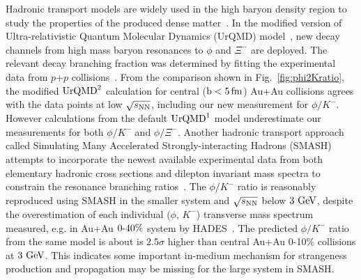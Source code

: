 \documentclass[%
 reprint,	
showpacs,
 amsmath,amssymb,
 aps,
 superscriptaddress,
]{revtex4-1}
\begin{document}
Hadronic transport models are widely used in the high baryon density region to study the properties of the produced dense matter~\cite{urQMD,UrQMD_2,Steinheimer_2015_UrQMD,Elfner_SMASH,Hartnack:2011cn,Song:2020clw}. In the modified version of Ultra-relativistic Quantum Molecular Dynamics (UrQMD) model~\cite{Steinheimer_2015_UrQMD}, new decay channels from high mass baryon resonances to $\phi$ and $\Xi^-$ are deployed. The relevant decay branching fraction was determined by fitting the experimental data from $p$+$p$ collisions~\cite{ANKE_phi}. From the comparison shown in Fig.~\ref{fig:phi2Kratio}, the modified $\textup{UrQMD}^{2}$ calculation for central ($\rm{b}<5\,\rm{fm}$) Au+Au collisions agrees with the data points at low ${\sqrt{s_{\rm NN}}}$, including our new measurement for $\phi/K^-$.
However calculations from the default $\textup{UrQMD}^{1}$ model underestimate our measurements for both $\phi/K^-$ and $\phi/\Xi^-$.   
Another hadronic transport approach called Simulating Many Accelerated Strongly-interacting Hadrons (SMASH) attempts to incorporate the newest available experimental data from both elementary hadronic cross sections and dilepton invariant mass spectra to constrain the resonance branching ratios~\cite{Elfner_SMASH}. The $\phi/K^-$ ratio is reasonably reproduced using SMASH in the smaller system and ${\sqrt{s_{\rm NN}}}$ below $\textup{3 GeV}$, despite the overestimation of each individual ($\phi$, $K^-$) transverse mass spectrum measured, e.g. in Au+Au $\textup{0-40\%}$ system by HADES~\cite{Elfner_SMASH,HADES_phi_AuAu}. The predicted $\phi/K^-$ ratio from the same model is about is 2.5$\sigma$ higher than central Au+Au 0-10\% collisions at $\textup{3 GeV}$. This indicates some important in-medium mechanism for strangeness production and propagation may be missing for the large system in SMASH.
\end{document}
